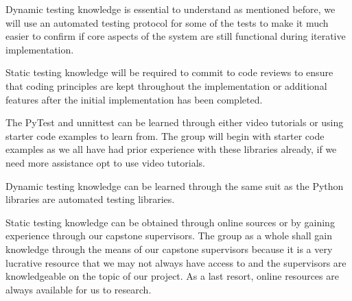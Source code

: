 \documentclass[12pt, titlepage]{article}
\begin{document}
Dynamic testing knowledge is essential to understand as mentioned before, we will use an automated testing protocol for some of the tests to make it much easier to confirm if core aspects of the system are still functional during iterative implementation.

Static testing knowledge will be required to commit to code reviews to ensure that coding principles are kept throughout the implementation or additional features after the initial implementation has been completed.

The PyTest and unnittest can be learned through either video tutorials or using starter code examples to learn from. The group will begin with starter code examples as we all have had prior experience with these libraries already, if we need more assistance opt to use video tutorials.

Dynamic testing knowledge can be learned through the same suit as the Python libraries are automated testing libraries.

Static testing knowledge can be obtained through online sources or by gaining experience through our capstone supervisors. The group as a whole shall gain knowledge through the means of our capstone supervisors because it is a very lucrative resource that we may not always have access to and the supervisors are knowledgeable on the topic of our project. As a last resort, online resources are always available for us to research. 
\end{document}
